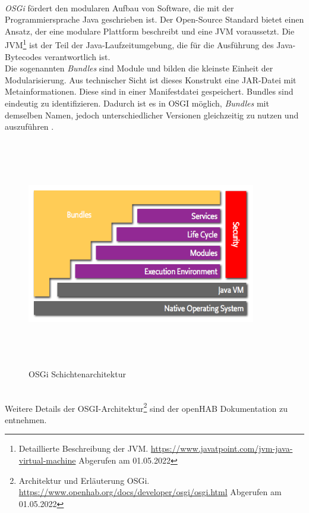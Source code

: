     \\
    \textit{OSGi} fördert den modularen Aufbau von Software, die mit der Programmiersprache Java geschrieben ist. Der Open-Source 
    Standard bietet einen Ansatz, der eine modulare Plattform beschreibt und eine \ac{JVM} voraussetzt. Die \acl{JVM}\footnote{Detaillierte Beschreibung der JVM. \url{https://www.javatpoint.com/jvm-java-virtual-machine} Abgerufen am 01.05.2022} 
    ist der Teil der Java-Laufzeitumgebung, die für die Ausführung des Java-Bytecodes verantwortlich ist.
    \\
    Die sogenannten \textit{Bundles} sind Module und bilden die kleinste Einheit der Modularisierung. Aus technischer Sicht ist 
    dieses Konstrukt eine \ac{JAR}-Datei mit Metainformationen. Diese sind in einer Manifestdatei gespeichert. Bundles sind 
    eindeutig zu identifizieren. Dadurch ist es in \acs{OSGI} möglich, \textit{Bundles} mit demselben Namen, jedoch unterschiedlicher 
    Versionen gleichzeitig zu nutzen und auszuführen \cite{openHAB-article}. 
    \begin{figure}[hbt!]
        \centering
        \includegraphics[width=10cm,height=10cm,keepaspectratio]{images/osgi-architecture.png}
        \caption{OSGi Schichtenarchitektur \cite{openhab-osgi}}
        \label{fig:osgilayer}
    \end{figure}
    \\
    Weitere Details der \acs{OSGI}-Architektur\footnote{Architektur und Erläuterung OSGi. \url{https://www.openhab.org/docs/developer/osgi/osgi.html} Abgerufen am 01.05.2022} 
    sind der openHAB Dokumentation zu entnehmen.

